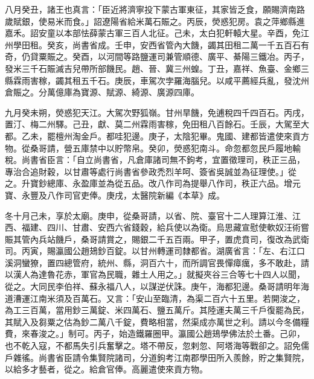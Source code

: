\begin{pinyinscope}
 八月癸丑，諸王也真言：「臣近將濟寧投下蒙古軍東征，其家皆乏食，願賜濟南路歲賦銀，使易米而食。」詔遼陽省給米萬石賑之。丙辰，熒惑犯房。袁之萍鄉縣進嘉禾。詔安童以本部怯薛蒙古軍三百人北征。己未，太白犯軒轅大星。辛酉，免江州學田租。癸亥，尚書省成。壬申，安西省管內大饑，蠲其田租二萬一千五百石有奇，仍貸粟賑之。癸酉，以河間等路鹽運司兼管順德、廣平、綦陽三鐵冶。丙子，發米三千石賑滅吉兒帶所部饑民。趙、晉、冀三州蝗。丁丑，嘉祥、魚臺、金鄉三縣霖雨害稼，蠲其租五千石。庚辰，車駕次孛羅海腦兒。以咸平薦經兵亂，發沈州倉賑之。分萬億庫為寶源、賦源、綺源、廣源四庫。



 九月癸未朔，熒惑犯天江。大駕次野狐嶺。甘州旱饑，免逋稅四千四百石。丙戌，置汀、梅二州驛。己丑，獻、莫二州霖雨害稼，免田租八百餘石。壬辰，大駕至大都。乙未，罷檀州淘金戶。都哇犯邊。庚子，太陰犯畢。鬼國、建都皆遣使來貢方物。從桑哥請，營五庫禁中以貯幣帛。癸卯，熒惑犯南斗。命忽都忽民戶履地輸稅。尚書省臣言：「自立尚書省，凡倉庫諸司無不鉤考，宜置徵理司，秩正三品，專治合追財穀，以甘肅等處行尚書省參政禿烈羊呵、簽省吳誠並為征理使。」從之。升寶鈔總庫、永盈庫並為從五品。改八作司為提舉八作司，秩正六品。增元寶、永豐及八作司官吏俸。庚戌，太醫院新編《本草》成。



 冬十月己未，享於太廟。庚申，從桑哥請，以省、院、臺官十二人理算江淮、江西、福建、四川、甘肅、安西六省錢穀，給兵使以為衛。烏思藏宣慰使軟奴汪術嘗賑其管內兵站饑戶，桑哥請賞之，賜銀二千五百兩。甲子，置虎賁司，復改為武衛司。丙寅，賜瀛國公趙鳷鈔百錠。以甘州轉運司隸都省。湖廣省言：「左、右江口溪洞蠻獠，置四總管府，統州、縣，洞百六十，而所調官畏憚瘴癘，多不敢赴，請以漢人為達魯花赤，軍官為民職，雜土人用之。」就擬夾谷三合等七十四人以聞，從之。大同民李伯祥、蘇永福八人，以謀逆伏誅。庚午，海都犯邊。桑哥請明年海道漕運江南米須及百萬石。又言：「安山至臨清，為渠二百六十五里。若開浚之，為工三百萬，當用鈔三萬錠、米四萬石、鹽五萬斤。其陸運夫萬三千戶復罷為民，其賦入及芻粟之估為鈔二萬八千錠，費略相當，然渠成亦萬世之利。請以今冬備糧費，來春浚之。」制可。丙子，始造鐵羅圈甲。瀛國公趙鳷學佛法於土番。己卯，也不乾入寇，不都馬失引兵奮擊之。塔不帶反，忽剌忽、阿塔海等戰卻之。詔免儒戶雜徭。尚書省臣請令集賢院諸司，分道鉤考江南郡學田所入羨餘，貯之集賢院，以給多才藝者，從之。給倉官俸。高麗遣使來貢方物。




\end{pinyinscope}
